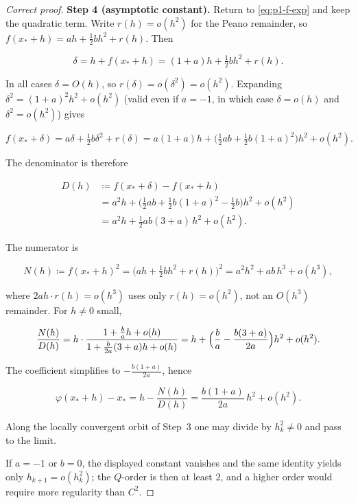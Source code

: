 \documentclass[11pt,a4paper]{article}
\begin{document}
\begin{proof}[Correct proof]
\textbf{Step 4 (asymptotic constant).}
Return to \eqref{eq:p1-f-exp} and keep the quadratic term. Write \(r(h)=o(h^{2})\) for the Peano remainder, so \(f(x_{*}+h)=ah+\tfrac12 bh^{2}+r(h)\). Then

\[
\delta
=
h+f(x_{*}+h)
=
(1+a)h+\tfrac12 bh^{2}+r(h).
\]

In all cases \(\delta=O(h)\), so \(r(\delta)=o(\delta^{2})=o(h^{2})\). Expanding \(\delta^{2}=(1+a)^{2}h^{2}+o(h^{2})\) (valid even if \(a=-1\), in which case \(\delta=o(h)\) and \(\delta^{2}=o(h^{2})\)) gives

\[
f(x_{*}+\delta)
=
a\delta+\tfrac12 b\delta^{2}+r(\delta)
=
a(1+a)h
+
\bigl(\tfrac12 ab+\tfrac12 b(1+a)^{2}\bigr)h^{2}
+
o(h^{2}).
\]

The denominator is therefore

\[
\begin{aligned}
D(h)
&\coloneqq
f(x_{*}+\delta)-f(x_{*}+h)
\\
&=
a^{2}h
+
\bigl(\tfrac12 ab+\tfrac12 b(1+a)^{2}-\tfrac12 b\bigr)h^{2}
+
o(h^{2})
\\
&=
a^{2}h+\tfrac12 ab(3+a)\,h^{2}+o(h^{2}).
\end{aligned}
\]

The numerator is

\[
N(h)
\coloneqq
f(x_{*}+h)^{2}
=
\bigl(ah+\tfrac12 bh^{2}+r(h)\bigr)^{2}
=
a^{2}h^{2}+ab\,h^{3}+o(h^{3}),
\]

where \(2ah\cdot r(h)=o(h^{3})\) uses only \(r(h)=o(h^{2})\), not an \(O(h^{3})\) remainder. For \(h\neq 0\) small,

\[
\frac{N(h)}{D(h)}
=
h\cdot
\frac{1+\frac{b}{a}h+o(h)}{1+\frac{b}{2a}(3+a)h+o(h)}
=
h
+
\Bigl(\frac{b}{a}-\frac{b(3+a)}{2a}\Bigr)h^{2}
+
o(h^{2}).
\]

The coefficient simplifies to \(-\frac{b(1+a)}{2a}\), hence

\[
\varphi(x_{*}+h)-x_{*}
=
h-\frac{N(h)}{D(h)}
=
\frac{b(1+a)}{2a}\,h^{2}+o(h^{2}).
\]

Along the locally convergent orbit of Step~3 one may divide by \(h_{k}^{2}\neq 0\) and pass to the limit.

If \(a=-1\) or \(b=0\), the displayed constant vanishes and the same identity yields only \(h_{k+1}=o(h_{k}^{2})\); the \(Q\)-order is then at least \(2\), and a higher order would require more regularity than \(C^{2}\).
\end{proof}
\end{document}
